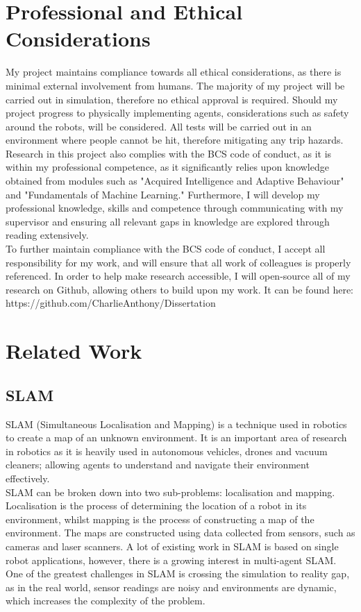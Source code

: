 \documentclass[12pt]{article}
\begin{document}
\section{Professional and Ethical Considerations}
My project maintains compliance towards all ethical considerations, as there is minimal external involvement from
humans. The majority of my project will be carried out in simulation, therefore no ethical approval is required. Should
my project progress to physically implementing agents, considerations such as safety around the robots, will be considered.
All tests will be carried out in an environment where people cannot be hit, therefore mitigating any trip hazards.\\
Research in this project also complies with the BCS code of conduct, as it is within my professional competence, as it
significantly relies upon knowledge obtained from modules such as "Acquired Intelligence and Adaptive Behaviour" and
"Fundamentals of Machine Learning." Furthermore, I will develop my professional knowledge, skills and competence through
communicating with my supervisor and ensuring all relevant gaps in knowledge are explored through reading extensively.\\
To further maintain compliance with the BCS code of conduct, I accept all responsibility for my work, and will ensure that
all work of colleagues is properly referenced. In order to help make research accessible, I will open-source all of my research
on Github, allowing others to build upon my work. It can be found here: https://github.com/CharlieAnthony/Dissertation\\

\section{Related Work}
\subsection{SLAM}
SLAM (Simultaneous Localisation and Mapping) is a technique used in robotics to create a map of an unknown environment.
It is an important area of research in robotics as it is heavily used in autonomous vehicles, drones and vacuum cleaners;
allowing agents to understand and navigate their environment effectively.\\
SLAM can be broken down into two sub-problems: localisation and mapping. Localisation is the process of determining the
location of a robot in its environment, whilst mapping is the process of constructing a map of the environment. The maps
are constructed using data collected from sensors, such as cameras and laser scanners. A lot of existing work in SLAM is
based on single robot applications, however, there is a growing interest in multi-agent SLAM. One of the greatest
challenges in SLAM is crossing the simulation to reality gap, as in the real world, sensor readings are noisy and
environments are dynamic, which increases the complexity of the problem.
\end{document}
